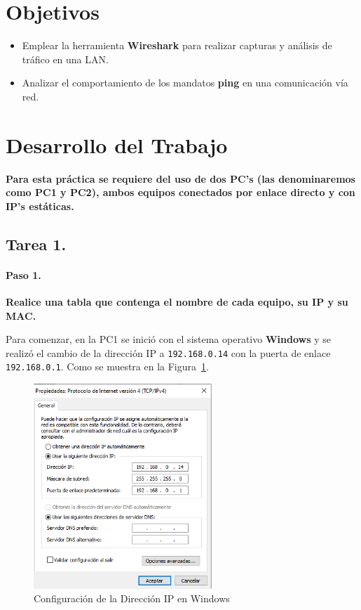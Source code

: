 \section{Objetivos}
    \begin{itemize}
        \item Emplear la herramienta \textbf{Wireshark} para realizar capturas y análisis de tráfico en una LAN.
        \item Analizar el comportamiento de los mandatos \textbf{ping} en una comunicación vía red.
    \end{itemize}
\section{Desarrollo del Trabajo}
    \textbf{Para esta práctica se requiere del uso de dos PC's (las denominaremos como PC1 y PC2), ambos equipos conectados por enlace directo y con IP's estáticas.}

    \subsection{Tarea 1.}
        \paragraph{Paso 1.}
        \textbf{Realice una tabla que contenga el nombre de cada equipo, su IP y su MAC.}

        Para comenzar, en la PC1 se inició con el sistema operativo \textbf{Windows} y se realizó el cambio de la dirección IP a \texttt{192.168.0.14} con la puerta de enlace \texttt{192.168.0.1}. Como se muestra en la Figura~\ref{fig:ip_windows}.

        \begin{figure}[H]
            \centering
            \includegraphics[width=0.6\textwidth]{img/cambiar_IP_Windows.png}
            \caption{Configuración de la Dirección IP en Windows}
            \label{fig:ip_windows}
        \end{figure}

